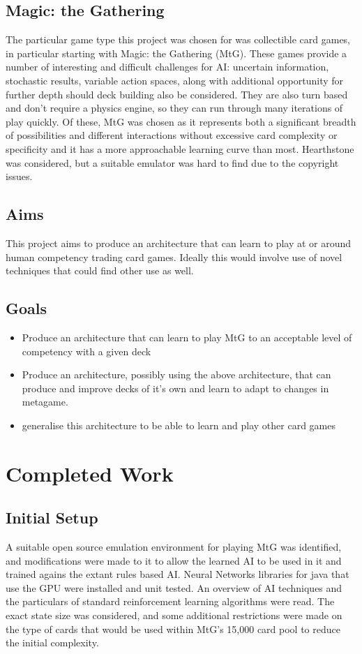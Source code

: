  \subsection{Magic: the Gathering}
  The particular game type this project was chosen for was collectible card games, in particular starting with Magic: the Gathering (MtG). These games provide a number of interesting and difficult challenges for AI: uncertain information, stochastic results, variable action spaces, along with additional opportunity for further depth should deck building also be considered. They are also turn based and don't require a physics engine, so they can run through many iterations of play quickly. Of these, MtG was chosen as it represents both a significant breadth of possibilities and different interactions without excessive card complexity or specificity and it has a more approachable learning curve than most. Hearthstone was considered, but a suitable emulator was hard to find due to the copyright issues. 
  \subsection{Aims}
  This project aims to produce an architecture that can learn to play at or around human competency trading card games. Ideally this would involve use of novel techniques that could find other use as well.
  \subsection{Goals}
  \begin{itemize}
    \item Produce an architecture that can learn to play MtG to an acceptable level of competency with a given deck
    \item Produce an architecture, possibly using the above architecture, that can produce and improve decks of it's own and learn to adapt to changes in metagame.
    \item generalise this architecture to be able to learn and play other card games
  \end{itemize}
  \section{Completed Work}
    \subsection{Initial Setup}
      A suitable open source emulation environment for playing MtG was identified, and modifications were made to it to allow the learned AI to be used in it and trained agains the extant rules based AI. Neural Networks libraries for java that use the GPU were installed and unit tested. An overview of AI techniques and the particulars of standard reinforcement learning algorithms were read. The exact state size was considered, and some additional restrictions were made on the type of cards that would be used within MtG's 15,000 card pool to reduce the initial complexity.
